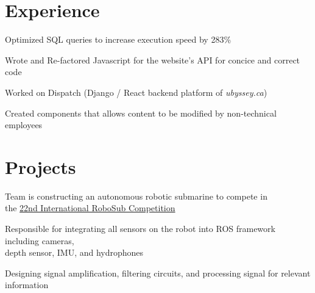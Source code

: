 \documentclass[]{deedy-resume-openfont}
\begin{document}

\section{Experience}

\begin{tightemize}
	\item Optimized SQL queries to increase execution speed by 283\%
	\item Wrote and Re-factored Javascript for the website’s API for concice and correct code
\end{tightemize}
\sectionsep

\begin{tightemize}
	\item Worked on Dispatch (Django / React backend platform of \textit{ubyssey.ca})
	\item Created components that allows content to be modified by non-technical employees
	\vspace{5pt}
\end{tightemize}
\sectionsep

\section{Projects}
\begin{tightemize}
	\item Team is constructing an autonomous robotic submarine to compete in \\ the \href{https://www.robonation.org/competition/robosub}{22nd International RoboSub Competition}
	\item Responsible for  integrating all sensors on the robot into ROS framework including cameras, \\ depth sensor, IMU, and hydrophones
	\item Designing signal amplification, filtering circuits, and processing signal for relevant information
\end{tightemize}
\sectionsep
\end{document}
